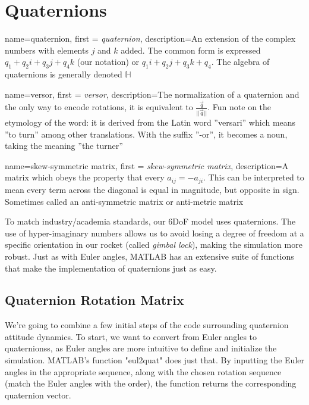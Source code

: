 \documentclass[12pt]{report}
\begin{document}
\section{Quaternions}\label{sec:quaternions}
{
    name=quaternion,
    first = {\textit{quaternion}},
    description={An extension of the complex numbers with elements $j$ and $k$ added. The common form is expressed $q_1+q_2i+q_3j+q_4k$ (our notation) or $q_1i+q_2j+q_3k+q_4$. The algebra of quaternions is generally denoted $\mathbb{H}$}
}

{
    name=versor,
    first = {\textit{versor}},
    description={The normalization of a quaternion and the only way to encode rotations, it is equivalent to $\frac{\vec{q}}{||\vec{q}||}$. Fun note on the etymology of the word: it is derived from the Latin word ''versari'' which means ''to turn'' among other translations. With the suffix ''-or'', it becomes a noun, taking the meaning ''the turner''}
}

{
    name=skew-symmetric matrix,
    first = {\textit{skew-symmetric matrix}},
    description={A matrix which obeys the property that every $a_{ij}=-a_{ji}$. This can be interpreted to mean every term across the diagonal is equal in magnitude, but opposite in sign. Sometimes called an anti-symmetric matrix or anti-metric matrix}
}

To match industry/academia standards, our 6DoF model uses \glspl{quaternion}. The use of hyper-imaginary numbers allows us to avoid losing a degree of freedom at a specific orientation in our rocket (called \textit{gimbal lock}), making the simulation more robust. Just as with Euler angles, MATLAB has an extensive suite of functions that make the implementation of \glspl{quaternion} just as easy. 

\subsection{Quaternion Rotation Matrix}

We're going to combine a few initial steps of the code surrounding \gls{quaternion} attitude dynamics. To start, we want to convert from Euler angles to \glspl{quaternion}s, as Euler angles are more intuitive to define and initialize the simulation. MATLAB's function "eul2quat" does just that. By inputting the Euler angles in the appropriate sequence, along with the chosen rotation sequence (match the Euler angles with the order), the function returns the corresponding quaternion vector. 
\end{document}
